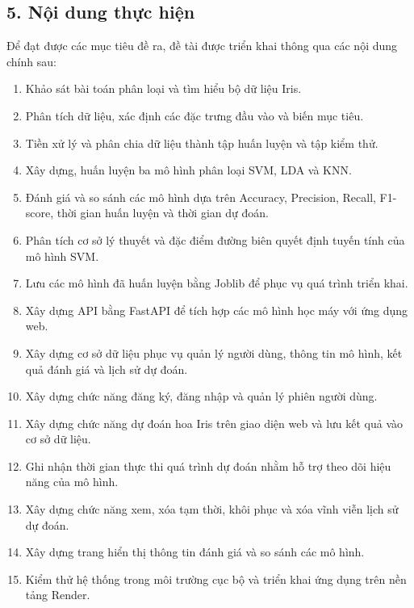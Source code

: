 \documentclass[14pt]{extarticle}
\begin{document}
\subsection*{5. Nội dung thực hiện}

\noindent Để đạt được các mục tiêu đề ra, đề tài được triển khai thông qua các nội dung chính sau:

\begin{enumerate}
	\item Khảo sát bài toán phân loại và tìm hiểu bộ dữ liệu Iris.
	
	\item Phân tích dữ liệu, xác định các đặc trưng đầu vào và biến mục tiêu.
	
	\item Tiền xử lý và phân chia dữ liệu thành tập huấn luyện và tập kiểm thử.
	
	\item Xây dựng, huấn luyện ba mô hình phân loại SVM, LDA và KNN.
	
	\item Đánh giá và so sánh các mô hình dựa trên Accuracy, Precision, Recall, F1-score, thời gian huấn luyện và thời gian dự đoán.
	
	\item Phân tích cơ sở lý thuyết và đặc điểm đường biên quyết định tuyến tính của mô hình SVM.
	
	\item Lưu các mô hình đã huấn luyện bằng Joblib để phục vụ quá trình triển khai.
	
	\item Xây dựng API bằng FastAPI để tích hợp các mô hình học máy với ứng dụng web.
	
	\item Xây dựng cơ sở dữ liệu phục vụ quản lý người dùng, thông tin mô hình, kết quả đánh giá và lịch sử dự đoán.
	
	\item Xây dựng chức năng đăng ký, đăng nhập và quản lý phiên người dùng.
	
	\item Xây dựng chức năng dự đoán hoa Iris trên giao diện web và lưu kết quả vào cơ sở dữ liệu.
	
	\item Ghi nhận thời gian thực thi quá trình dự đoán nhằm hỗ trợ theo dõi hiệu năng của mô hình.
	
	\item Xây dựng chức năng xem, xóa tạm thời, khôi phục và xóa vĩnh viễn lịch sử dự đoán.
	
	\item Xây dựng trang hiển thị thông tin đánh giá và so sánh các mô hình.
	
	\item Kiểm thử hệ thống trong môi trường cục bộ và triển khai ứng dụng trên nền tảng Render.
\end{enumerate}
\end{document}
